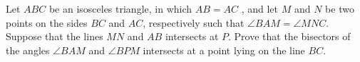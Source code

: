 Let $ABC$ be an isosceles triangle, in which $AB=AC$ , and let $M$ and $N$ be two points on the sides $BC$ and $AC$,  respectively such that $\angle BAM = \angle MNC$. Suppose that the lines $MN$ and $AB$ intersects at $P$. Prove that the bisectors of the angles $\angle BAM$ and $\angle BPM$ intersects at a point lying on the line $BC$.
